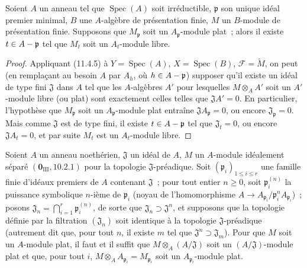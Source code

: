 \begin{corollary}[11.4.6]
\label{IV.11.4.6-fr}
Soient $A$ un anneau tel que $\operatorname{Spec}(A)$ soit irréductible,
$\mathfrak p$ son unique idéal premier minimal, $B$ une $A$-algèbre de
présentation finie, $M$ un $B$-module de présentation finie. Supposons que
$M_\mathfrak p$ soit un $A_\mathfrak p$-module plat~; alors il existe
$t\in A-\mathfrak p$ tel que $M_t$ soit un $A_t$-module libre.
\end{corollary}

\begin{proof}
Appliquant (11.4.5) à $Y=\operatorname{Spec}(A)$, $X=\operatorname{Spec}(B)$,
$\mathcal F=\widetilde M$, on peut (en remplaçant au besoin $A$ par $A_h$, où
$h\in A-\mathfrak p$) supposer qu'il existe un idéal de type fini
$\mathfrak J$ dans $A$ tel que les $A$-algèbres $A'$ pour lesquelles
$M\otimes_A A'$ soit un $A'$-module libre (ou plat) sont exactement celles
telles que $\mathfrak JA'=0$. En particulier, l'hypothèse que
$M_\mathfrak p$ soit un $A_\mathfrak p$-module plat entraîne
$\mathfrak JA_\mathfrak p=0$, ou encore $\mathfrak J_\mathfrak p=0$. Mais
comme $\mathfrak J$ est de type fini, il existe $t\in A-\mathfrak p$ tel que
$\mathfrak J_t=0$, ou encore $\mathfrak JA_t=0$, et par suite $M_t$ est un
$A_t$-module libre.
\end{proof}

\begin{proposition}[11.4.7]
\label{IV.11.4.7-fr}
Soient $A$ un anneau noethérien, $\mathfrak J$ un idéal de $A$, $M$ un
$A$-module idéalement séparé $(\mathbf 0_{\mathrm{III}},10.2.1)$ pour la
topologie $\mathfrak J$-préadique. Soit $(\mathfrak p_i)_{1\leq i\leq r}$ une
famille finie d'idéaux premiers de $A$ contenant $\mathfrak J$~; pour tout
entier $n\geq0$, soit $\mathfrak p_i^{(n)}$ la puissance symbolique $n$-ième de
$\mathfrak p_i$ (noyau de l'homomorphisme
$A\to A_{\mathfrak p_i}/\mathfrak p_i^nA_{\mathfrak p_i}$)~; posons
$\mathfrak J_n=\bigcap_{i=1}^{r}\mathfrak p_i^{(n)}$, de sorte que
$\mathfrak J_n\supset\mathfrak J^n$, et supposons que la topologie définie par
la filtration $(\mathfrak J_n)$ soit identique à la topologie
$\mathfrak J$-préadique (autrement dit que, pour tout $n$, il existe $m$ tel
que $\mathfrak J^n\supset\mathfrak J_m$). Pour que $M$ soit un $A$-module
plat, il faut et il suffit que $M\otimes_A(A/\mathfrak J)$ soit un
$(A/\mathfrak J)$-module plat et que, pour tout $i$,
$M\otimes_AA_{\mathfrak p_i}=M_{\mathfrak p_i}$ soit un
$A_{\mathfrak p_i}$-module plat.
\end{proposition}

